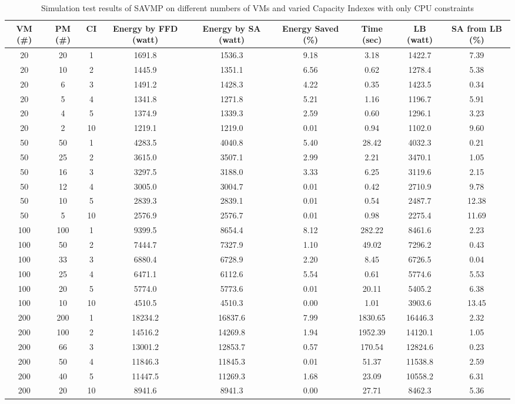 \documentclass[10pt, conference, compsocconf]{IEEEtran}
\begin{document}
\begin{table*}[t]
\begin{center}
\caption{
Simulation test results of SAVMP on different numbers of VMs and
varied Capacity Indexes with only CPU constraints
}
\begin{tabular}
{c|c|c|c|c|c|c|c|c}
\hline\hline
VM (\#) & PM (\#) & CI & Energy by FFD (watt)  & Energy by SA (watt)  & Energy
Saved (\%) & Time (sec)  & LB (watt) & SA from LB (\%)\\
\hline
20 & 20 & 1 & 1691.8 & 1536.3 & 9.18 & 3.18 & 1422.7 & 7.39\\
20 & 10 & 2 & 1445.9 & 1351.1 & 6.56 & 0.62 & 1278.4 & 5.38\\
20 & 6  & 3 & 1491.2 & 1428.3 & 4.22 & 0.35 & 1423.5 & 0.34\\
20 & 5  & 4 & 1341.8 & 1271.8 & 5.21 & 1.16 & 1196.7 & 5.91\\
20 & 4  & 5 & 1374.9 & 1339.3 & 2.59 & 0.60 & 1296.1 & 3.23\\
20 & 2  &10 & 1219.1 & 1219.0 & 0.01 & 0.94 & 1102.0 & 9.60\\
\hline
50 & 50 &1 & 4283.5 & 4040.8 & 5.40 & 28.42 & 4032.3 & 0.21\\
50 & 25 &2 & 3615.0 & 3507.1 & 2.99 & 2.21 & 3470.1 & 1.05\\
50 & 16 &3 & 3297.5 & 3188.0 & 3.33 & 6.25 & 3119.6 & 2.15\\
50 & 12 &4 & 3005.0 & 3004.7 & 0.01 & 0.42 & 2710.9 & 9.78\\
50 & 10 &5 & 2839.3 & 2839.1 & 0.01 & 0.54 & 2487.7 & 12.38\\
50 & 5  &10 & 2576.9 & 2576.7 & 0.01 & 0.98 & 2275.4 & 11.69\\
\hline
100 &100 & 1 & 9399.5 & 8654.4 & 8.12 & 282.22 & 8461.6 & 2.23\\
100 &50  & 2 & 7444.7 & 7327.9 & 1.10 & 49.02 & 7296.2 & 0.43\\
100 &33  & 3 & 6880.4 & 6728.9 & 2.20 & 8.45 & 6726.5 & 0.04\\
100 &25  & 4 & 6471.1 & 6112.6 & 5.54 & 0.61 & 5774.6 & 5.53\\
100 &20  & 5 & 5774.0 & 5773.6 & 0.01 & 20.11 & 5405.2 & 6.38\\
100 &10  & 10 & 4510.5 & 4510.3 & 0.00 & 1.01 & 3903.6 & 13.45\\
\hline
200 &200 & 1 & 18234.2 & 16837.6 & 7.99 & 1830.65 & 16446.3 & 2.32\\
200 &100 & 2 & 14516.2 & 14269.8 & 1.94 & 1952.39 & 14120.1 & 1.05\\
200 &66  & 3 & 13001.2 & 12853.7 & 0.57 & 170.54 & 12824.6 & 0.23\\
200 &50  & 4 & 11846.3 & 11845.3 & 0.01 & 51.37 & 11538.8 & 2.59\\
200 &40  & 5 & 11447.5 & 11269.3 & 1.68 & 23.09 & 10558.2 & 6.31\\
200 &20  & 10 & 8941.6 & 8941.3 & 0.00 & 27.71 & 8462.3 & 5.36\\
\hline\hline
\end{tabular}
\end{center}
\end{table*}
\end{document}
